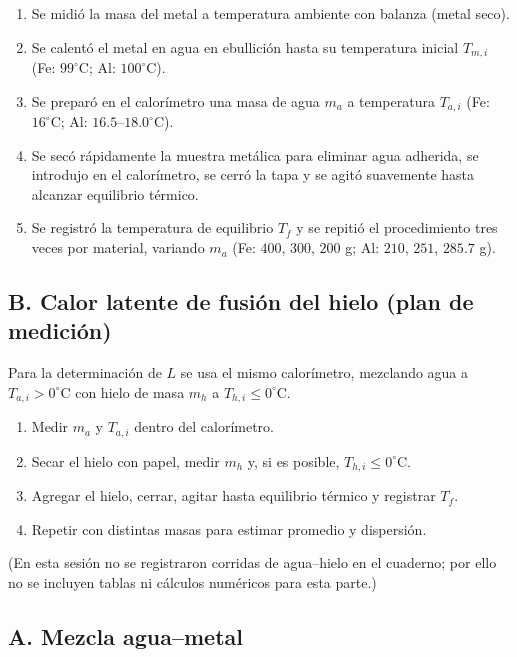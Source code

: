 \documentclass[11pt,twocolumn]{article}
\begin{document}
\begin{enumerate}
    \item Se midió la masa del metal a temperatura ambiente con balanza (metal seco).
    \item Se calentó el metal en agua en ebullición hasta su temperatura inicial $T_{m,i}$ (Fe: $99^\circ$C; Al: $100^\circ$C).
    \item Se preparó en el calorímetro una masa de agua $m_a$ a temperatura $T_{a,i}$ (Fe: $16^\circ$C; Al: $16{.}5$–$18{.}0^\circ$C).
    \item Se secó rápidamente la muestra metálica para eliminar agua adherida, se introdujo en el calorímetro,
          se cerró la tapa y se agitó suavemente hasta alcanzar equilibrio térmico.
    \item Se registró la temperatura de equilibrio $T_f$ y se repitió el procedimiento tres veces por material,
          variando $m_a$ (Fe: $400$, $300$, $200$ g; Al: $210$, $251$, $285{.}7$ g).
\end{enumerate}

\subsection*{B. Calor latente de fusión del hielo (plan de medición)}
Para la determinación de $L$ se usa el mismo calorímetro, mezclando agua a $T_{a,i}>0^\circ$C
con hielo de masa $m_h$ a $T_{h,i}\le 0^\circ$C.
\begin{enumerate}
    \item Medir $m_a$ y $T_{a,i}$ dentro del calorímetro.
    \item Secar el hielo con papel, medir $m_h$ y, si es posible, $T_{h,i}\le 0^\circ$C.
    \item Agregar el hielo, cerrar, agitar hasta equilibrio térmico y registrar $T_f$.
    \item Repetir con distintas masas para estimar promedio y dispersión.
\end{enumerate}
(En esta sesión no se registraron corridas de agua–hielo en el cuaderno; por ello no se incluyen tablas ni cálculos numéricos para esta parte.)

\subsection*{A. Mezcla agua–metal}
\end{document}
